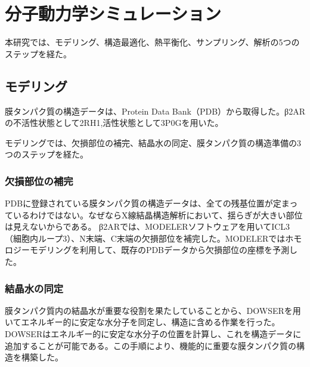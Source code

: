 \section{分子動力学シミュレーション}
本研究では、モデリング、構造最適化、熱平衡化、サンプリング、解析の5つのステップを経た。

\subsection{モデリング}
膜タンパク質の構造データは、Protein Data Bank（PDB）から取得した。β2ARの不活性状態として2RH1,活性状態として3P0Gを用いた。

モデリングでは、欠損部位の補完、結晶水の同定、膜タンパク質の構造準備の3つのステップを経た。

\subsubsection{欠損部位の補完}
PDBに登録されている膜タンパク質の構造データは、全ての残基位置が定まっているわけではない。なぜならX線結晶構造解析において、揺らぎが大きい部位は見えないからである。
β2ARでは、MODELERソフトウェアを用いてICL3（細胞内ループ3）、N末端、C末端の欠損部位を補完した。MODELERではホモロジーモデリングを利用して、既存のPDBデータから欠損部位の座標を予測した。

\subsubsection{結晶水の同定}

膜タンパク質内の結晶水が重要な役割を果たしていることから、DOWSERを用いてエネルギー的に安定な水分子を同定し、構造に含める作業を行った。
DOWSERはエネルギー的に安定な水分子の位置を計算し、これを構造データに追加することが可能である。この手順により、機能的に重要な膜タンパク質の構造を構築した。


